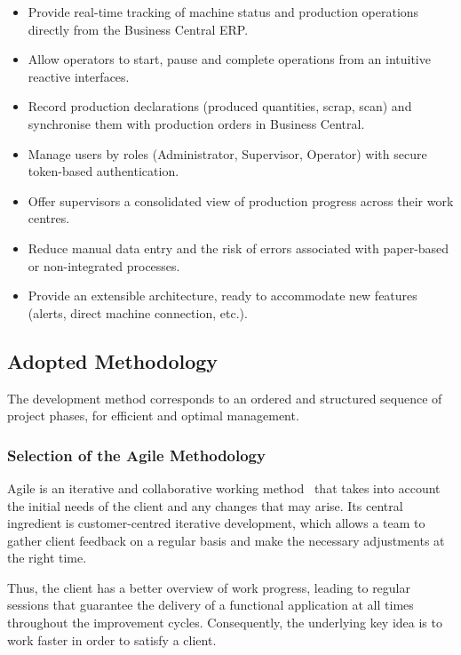 \begin{itemize}
	\item Provide real-time tracking of machine status and production operations directly
	      from the Business Central ERP.
	\item Allow operators to start, pause and complete operations from an intuitive
	      reactive interfaces.
	\item Record production declarations (produced quantities, scrap, scan) and synchronise
	      them with production orders in Business Central.
	\item Manage users by roles (Administrator, Supervisor, Operator) with secure
	      token-based authentication.
	\item Offer supervisors a consolidated view of production progress across their
	      work centres.
	\item Reduce manual data entry and the risk of errors associated with paper-based
	      or non-integrated processes.
	\item Provide an extensible architecture, ready to accommodate new features
	      (alerts, direct machine connection, etc.).
\end{itemize}

\subsection{Adopted Methodology}

The development method corresponds to an ordered and structured sequence of project
phases, for efficient and optimal management.

\subsubsection*{Selection of the Agile Methodology}

Agile is an iterative and collaborative working method~\cite{agilemanifesto} that takes into account the
initial needs of the client and any changes that may arise. Its central ingredient is
customer-centred iterative development, which allows a team to gather client feedback
on a regular basis and make the necessary adjustments at the right time.

Thus, the client has a better overview of work progress, leading to regular sessions
that guarantee the delivery of a functional application at all times throughout the
improvement cycles. Consequently, the underlying key idea is to work faster in order
to satisfy a client.

